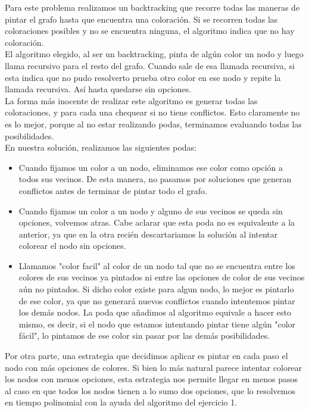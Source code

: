 Para este problema realizamos un backtracking que recorre todas las maneras de pintar el grafo hasta que encuentra una coloración. Si se recorren todas las coloraciones posibles y no se encuentra ninguna, el algoritmo indica que no hay coloración.\\

El algoritmo elegido, al ser un backtracking, pinta de algún color un nodo y luego llama recursivo para el resto del grafo. Cuando sale de esa llamada recursiva, si esta indica que no pudo resolverto prueba otro color en ese nodo y repite la llamada recursiva. Así hasta quedarse sin opciones. \\

La forma más inocente de realizar este algoritmo es generar todas las coloraciones, y para cada una chequear si no tiene conflictos. Esto claramente no es lo mejor, porque al no estar realizando podas, terminamos evaluando todas las posibilidades. \\
En nuestra solución, realizamos las siguientes podas:
\begin{itemize}
\item Cuando fijamos un color a un nodo, eliminamos ese color como opción a todos sus vecinos. De esta manera, no pasamos por soluciones que generan conflictos antes de terminar de pintar todo el grafo.
\item Cuando fijamos un color a un nodo y alguno de sus vecinos se queda sin opciones, volvemos atras. Cabe aclarar que esta poda no es equivalente a la anterior, ya que en la otra recién descartariamos la solución al intentar colorear el nodo sin opciones.
\item Llamamos "color facil" al color de un nodo tal que no se encuentra entre los colores de sus vecinos ya pintados ni entre las opciones de color de sus vecinos aún no pintados. Si dicho color existe para algun nodo, lo mejor es pintarlo de ese color, ya que no generará nuevos conflictos cuando intentemos pintar los demás nodos. La poda que añadimos al algoritmo equivale a hacer esto mismo, es decir, si el nodo que estamos intentando pintar tiene algún "color fácil", lo pintamos de ese color sin pasar por las demás posibilidades.
\end{itemize}

Por otra parte, una estrategia que decidimos aplicar es pintar en cada paso el nodo con más opciones de colores. Si bien lo más natural parece intentar colorear los nodos con menos opciones, esta estrategia nos permite llegar en menos pasos al caso en que todos los nodos tienen a lo sumo dos opciones, que lo resolvemos en tiempo polinomial con la ayuda del algoritmo del ejercicio 1. \\

